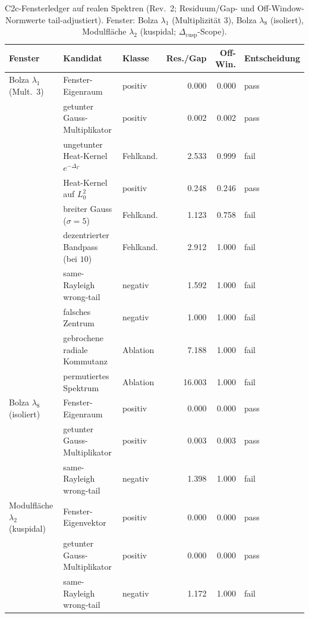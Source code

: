 \documentclass[12pt,a4paper]{article}
\theoremstyle{definition}
\theoremstyle{remark}
\newcommand{\Delop}{\Delta_{\Gamma}}
\begin{document}
\begin{table}[htp]
\centering
\footnotesize
\setlength{\tabcolsep}{4pt}
{\renewcommand{\arraystretch}{1.12}
\begin{tabularx}{\textwidth}{@{}L{2.5cm}YL{1.9cm}rrl@{}}
\toprule
\textbf{Fenster} & \textbf{Kandidat} & \textbf{Klasse} &
\textbf{Res./Gap} & \textbf{Off-Win.} & \textbf{Entscheidung} \\
\midrule
Bolza $\lambda_1$ (Mult.\ $3$)
  & Fenster-Eigenraum & positiv & 0.000 & 0.000 & pass \\
  & getunter Gauss-Multiplikator & positiv & 0.002 & 0.002 & pass \\
  & ungetunter Heat-Kernel $e^{-\Delop}$ & Fehlkand. & 2.533 & 0.999 & fail \\
  & Heat-Kernel auf $L^2_0$ & positiv & 0.248 & 0.246 & pass \\
  & breiter Gauss ($\sigma{=}5$) & Fehlkand. & 1.123 & 0.758 & fail \\
  & dezentrierter Bandpass (bei $10$) & Fehlkand. & 2.912 & 1.000 & fail \\
  & same-Rayleigh wrong-tail & negativ & 1.592 & 1.000 & fail \\
  & falsches Zentrum & negativ & 1.000 & 1.000 & fail \\
  & gebrochene radiale Kommutanz & Ablation & 7.188 & 1.000 & fail \\
  & permutiertes Spektrum & Ablation & 16.003 & 1.000 & fail \\
\midrule
Bolza $\lambda_8$ (isoliert)
  & Fenster-Eigenraum & positiv & 0.000 & 0.000 & pass \\
  & getunter Gauss-Multiplikator & positiv & 0.003 & 0.003 & pass \\
  & same-Rayleigh wrong-tail & negativ & 1.398 & 1.000 & fail \\
\midrule
Modulfläche $\lambda_2$ (kuspidal)
  & Fenster-Eigenvektor & positiv & 0.000 & 0.000 & pass \\
  & getunter Gauss-Multiplikator & positiv & 0.000 & 0.000 & pass \\
  & same-Rayleigh wrong-tail & negativ & 1.172 & 1.000 & fail \\
\bottomrule
\end{tabularx}}
\caption{C2c-Fensterledger auf realen Spektren (Rev.~2; Residuum/Gap- und
Off-Window-Normwerte tail-adjustiert). Fenster: Bolza $\lambda_1$
(Multiplizität $3$), Bolza $\lambda_8$ (isoliert), Modulfläche $\lambda_2$
(kuspidal; $\Delta_{\mathrm{cusp}}$-Scope).}
\label{tab:c2c-real-ledger}
\end{table}
\end{document}
